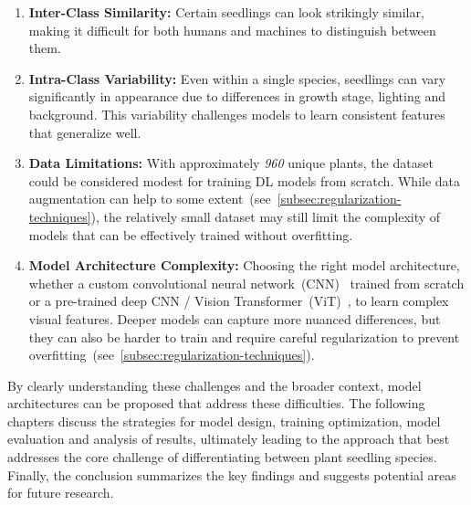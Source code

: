 \begin{enumerate}
    \item \textbf{Inter-Class Similarity:} Certain seedlings can look strikingly similar, making it difficult for both humans and machines to distinguish between them.
    \item \textbf{Intra-Class Variability:} Even within a single species, seedlings can vary significantly in appearance due to differences in growth stage, lighting and background. This variability challenges models to learn consistent features that generalize well.
    \item \textbf{Data Limitations:} With approximately \textit{960} unique plants, the dataset could be considered modest for training DL models from scratch. While data augmentation can help to some extent~(see~\ref{subsec:regularization-techniques}), the relatively small dataset may still limit the complexity of models that can be effectively trained without overfitting.
    \item \textbf{Model Architecture Complexity:} Choosing the right model architecture, whether a custom convolutional neural network~(CNN)~\cite{o2015introduction} trained from scratch or a pre-trained deep CNN / Vision Transformer~(ViT)~\cite{DBLP:journals/corr/abs-2010-11929}, to learn complex visual features. Deeper models can capture more nuanced differences, but they can also be harder to train and require careful regularization to prevent overfitting~(see~\ref{subsec:regularization-techniques}).
\end{enumerate}

By clearly understanding these challenges and the broader context, model architectures can be proposed that address these difficulties. The following chapters discuss the strategies for model design, training optimization, model evaluation and analysis of results, ultimately leading to the approach that best addresses the core challenge of differentiating between plant seedling species. Finally, the conclusion summarizes the key findings and suggests potential areas for future research.